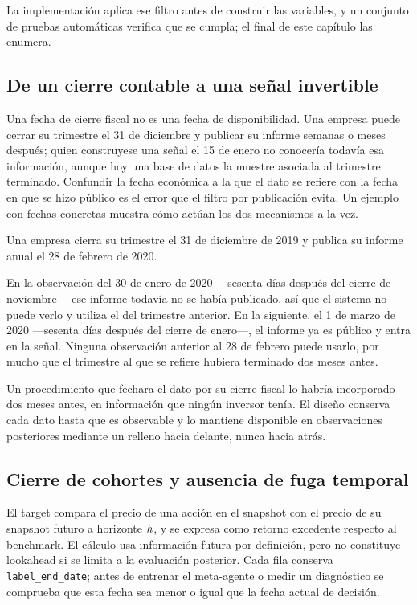 La implementación aplica ese filtro antes de construir las variables, y un conjunto de pruebas
automáticas verifica que se cumpla; el final de este capítulo las enumera.

\subsection{De un cierre contable a una señal invertible}

Una fecha de cierre fiscal no es una fecha de disponibilidad. Una empresa puede cerrar su trimestre
el 31 de diciembre y publicar su informe semanas o meses después; quien construyese una señal el 15
de enero no conocería todavía esa información, aunque hoy una base de datos la muestre asociada al
trimestre terminado. Confundir la fecha económica a la que el dato se refiere con la fecha en que se
hizo público es el error que el filtro por publicación evita. Un ejemplo con fechas concretas
muestra cómo actúan los dos mecanismos a la vez.

\begin{ejemplo}
Una empresa cierra su trimestre el 31 de diciembre de 2019 y publica su informe anual el 28 de
febrero de 2020.

En la observación del 30 de enero de 2020 ---sesenta días después del cierre de noviembre--- ese
informe todavía no se había publicado, así que el sistema no puede verlo y utiliza el del trimestre
anterior. En la siguiente, el 1 de marzo de 2020 ---sesenta días después del cierre de enero---, el
informe ya es público y entra en la señal. Ninguna observación anterior al 28 de febrero puede
usarlo, por mucho que el trimestre al que se refiere hubiera terminado dos meses antes.
\end{ejemplo}

Un procedimiento que fechara el dato por su cierre fiscal lo habría incorporado dos meses antes, en
información que ningún inversor tenía. El diseño conserva cada dato hasta que es observable y lo
mantiene disponible en observaciones posteriores mediante un relleno hacia delante, nunca hacia
atrás.

\subsection{Cierre de cohortes y ausencia de fuga temporal}

El target compara el precio de una acción en el snapshot con el precio de su snapshot futuro a
horizonte \(h\), y se expresa como retorno excedente respecto al benchmark. El cálculo usa
información futura por definición, pero no constituye lookahead si se limita a la evaluación
posterior. Cada fila conserva \texttt{label\_end\_date}; antes de entrenar el meta-agente o medir
un diagnóstico se comprueba que esta fecha sea menor o igual que la fecha actual de decisión.

